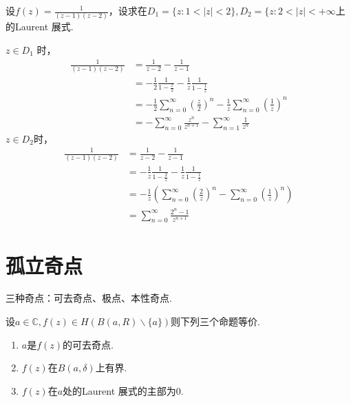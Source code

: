 \begin{eg}
	\color{blue}
	设$\displaystyle{f(z)=\frac{1}{(z-1)(z-2)}}$，设求在$\displaystyle{D_1 = \{ z : 1 < \vert z \vert < 2\}, D_2 = \{ z : 2 < \vert z \vert < + \infty}$上的{\rm Laurent} 展式.
	\color{black}
\end{eg}
\begin{jie}
	
	$\displaystyle{z \in D_1}$ 时，
	\begin{align*}
	\frac{1}{(z-1)(z-2)} &= \frac{1}{z-2} - \frac{1}{z-1} \\
	&= -\frac{1}{2} \frac{1}{1 - \frac{z}{2}} - \frac{1}{z} \frac{1}{1 - \frac{1}{z}}\\
	&= -\frac{1}{2} \sum_{n=0}^{\infty} (\frac{z}{2})^n - \frac{1}{z} \sum_{n=0}^{\infty} (\frac{1}{z})^n\\
	&=-\sum_{n=0}^{\infty} \frac{z^n}{z^{n+1}} - \sum_{n=1}^{\infty} \frac{1}{z^n}
	\end{align*}
	$\displaystyle{z \in D_2}$时，
	\begin{align*}
	\frac{1}{(z-1)(z-2)} &= \frac{1}{z-2} - \frac{1}{z-1} \\
	&= -\frac{1}{z} \frac{1}{1 - \frac{2}{z}} - \frac{1}{z} \frac{1}{1 - \frac{1}{z}}\\
	&= -\frac{1}{z}( \sum_{n=0}^{\infty} (\frac{2}{z})^n -\sum_{n=0}^{\infty} (\frac{1}{z})^n)\\
	&= \sum_{n=0}^{\infty} \frac{2^n - 1}{z^{n+1}}
	\end{align*}		
	
\end{jie}

\section{孤立奇点}
三种奇点：可去奇点、极点、本性奇点.
\begin{theorem}
	设$\displaystyle{a \in \mathbb{C}, f(z) \in H(B(a, R) \backslash \{ a\})}$则下列三个命题等价.
	\begin{enumerate} [(1)]
		\item $\displaystyle{a}$是$\displaystyle{f(z)}$的可去奇点.
		\item $\displaystyle{f(z)}$在$\displaystyle{B(a, \delta)}$上有界.
		\item $\displaystyle{f(z)}$在$\displaystyle{a}$处的{\rm Laurent} 展式的主部为0.
	\end{enumerate}
\end{theorem}

